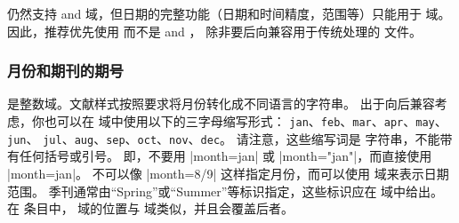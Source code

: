 \biblatex 仍然支持  and  域，但日期的完整功能（日期和时间精度，范围等）只能用于 域。因此，推荐优先使用 而不是
 and ， 除非要后向兼容用于传统\bibtex 处理的 文件。


\subsubsection{月份和期刊的期号}
\label{bib:use:iss}

 是整数域。文献样式按照要求将月份转化成不同语言的字符串。
出于向后兼容考虑，你也可以在  域中使用以下的三字母缩写形式：
\texttt{jan}、\texttt{feb}、\texttt{mar}、\texttt{apr}、\texttt{may}、\texttt{jun}、
\texttt{jul}、\texttt{aug}、\texttt{sep}、\texttt{oct}、\texttt{nov}、\texttt{dec}。
请注意，这些缩写词是 \BibTeX 字符串，不能带有任何括号或引号。
即，不要用 |month={jan}| 或 |month="jan"|，而直接使用 |month=jan|。
不可以像 |month={8/9}| 这样指定月份，而可以使用  域来表示日期范围。
季刊通常由“Spring”或“Summer”等标识指定，这些标识应在  域中给出。
在  条目中， 域的位置与  域类似，并且会覆盖后者。

